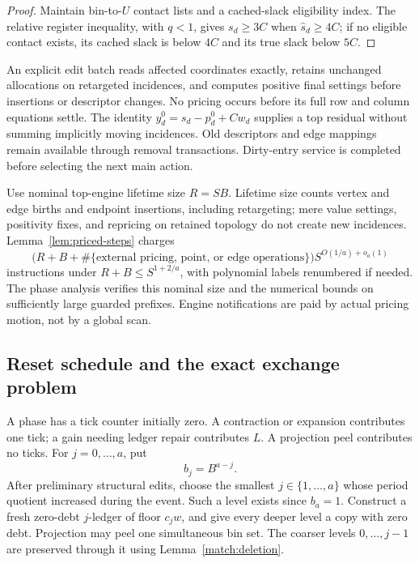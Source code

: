 \begin{proof}
Maintain bin-to-\(U\) contact lists and a cached-slack eligibility
index.  The relative register inequality, with \(q<1\), gives
\(s_d\ge3C\) when \(\widehat s_d\ge4C\); if no eligible contact
exists, its cached slack is below \(4C\) and its true slack below
\(5C\).
\end{proof}

An explicit edit batch reads affected coordinates exactly, retains
unchanged allocations on retargeted incidences, and computes positive
final settings before insertions or descriptor changes.  No pricing
occurs before its full row and column equations settle.  The identity
\(y^0_d=s_d-p^0_d+Cw_d\) supplies a top residual without summing
implicitly moving incidences.  Old descriptors and edge mappings
remain available through removal transactions.  Dirty-entry service
is completed before selecting the next main action.

Use nominal top-engine lifetime size \(R=SB\).  Lifetime size counts
vertex and edge births and endpoint insertions, including retargeting;
mere value settings, positivity fixes, and repricing on retained
topology do not create new incidences.  Lemma~\ref{lem:priced-steps}
charges
\[
 \bigl(R+B+\#\{\text{external pricing, point, or edge operations}\}\bigr)
                  S^{O(1/a)+o_a(1)}
\]
instructions under \(R+B\le S^{1+2/a}\), with polynomial labels
renumbered if needed.  The phase analysis verifies this nominal
size and the numerical bounds on sufficiently large guarded prefixes.
Engine notifications are paid by actual pricing motion, not by a
global scan.

\subsection{Reset schedule and the exact exchange problem}
\label{match:reset}

A phase has a tick counter initially zero.  A contraction or expansion
contributes one tick; a gain needing ledger repair contributes \(L\).
A projection peel contributes no ticks.  For \(j=0,\ldots,a\), put
\begin{equation}
                             b_j=B^{a-j}.
 \label{match:periods}
\end{equation}
After preliminary structural edits, choose the smallest
\(j\in\{1,\ldots,a\}\) whose period quotient increased during the
event.  Such a level exists since \(b_a=1\).  Construct a fresh
zero-debt \(j\)-ledger of floor \(c_jw\), and give every deeper
level a copy with zero debt.  Projection may peel one simultaneous
bin set.  The coarser levels \(0,\ldots,j-1\) are preserved through
it using Lemma~\ref{match:deletion}.

